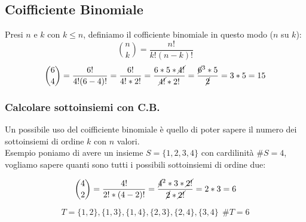 \subsection{Coifficiente Binomiale}
Presi $n$ e $k$ con $k \le n$, definiamo il cofficiente binomiale in questo modo ($n$ su $k$):
$$ \binom{n}{k} = \frac{n!}{k!(n-k)!} $$
$$ \binom{6}{4} = \frac{6!}{4!(6-4)!} = \frac{6!}{4!*2!} = \frac{6*5*\cancel{4!}}{\cancel{4!}*2!} = \frac{\cancel{6}^3*5}{\cancel{2}} = 3*5 = 15 $$

\subsubsection{Calcolare sottoinsiemi con C.B.}
Un possibile uso del coifficiente binomiale è quello di poter sapere il numero dei sottoinsiemi di ordine $k$ con $n$ valori.\\
Esempio poniamo di avere un insieme $S=\{1,2,3,4\}$ con cardilinità $\#S = 4$, vogliamo sapere quanti sono tutti i possibili sottoinsiemi di ordine due:

$$ \binom{4}{2} = \frac{4!}{2!*(4-2)!} = \frac{\cancel{4}^2*3*\cancel{2!}}{\cancel{2}*\cancel{2!}} = 2*3 = 6$$

$$ T={ \{1,2\}, \{1,3\}, \{1,4\}, \{2,3\}, \{2,4\}, \{3,4\}} \: \: \#T=6 $$

